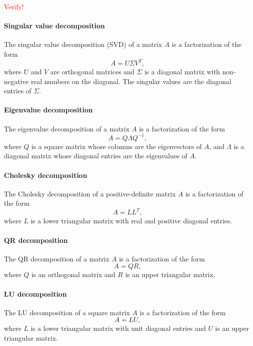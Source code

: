 \textcolor{red}{Verify!}

\paragraph{Singular value decomposition} The singular value decomposition (SVD) of a
matrix $A$ is a factorization of the form
\begin{equation}
  \label{eq:svd}
  A = U \Sigma V^T\text{,}
\end{equation}
where $U$ and $V$ are orthogonal matrices and $\Sigma$ is a diagonal
matrix with non-negative real numbers on the diagonal.  The singular values are the
diagonal entries of $\Sigma$.

\paragraph{Eigenvalue decomposition}  The eigenvalue decomposition of a matrix $A$
is a factorization of the form
\begin{equation}
  \label{eq:eigdec}
  A = Q \Lambda Q^{-1}\text{,}
\end{equation}
where $Q$ is a square matrix whose columns are the eigenvectors of $A$, and
$\Lambda$ is a diagonal matrix whose diagonal entries are the eigenvalues of
$A$.

\paragraph{Cholesky decomposition}  The Cholesky decomposition of a positive-definite
matrix $A$ is a factorization of the form
\begin{equation}
  \label{eq:chol}
  A = L L^T\text{,}
\end{equation}
where $L$ is a lower triangular matrix with real and positive diagonal entries.

\paragraph{QR decomposition}  The QR decomposition of a matrix $A$ is a
factorization of the form
\begin{equation}
  \label{eq:qr}
  A = Q R\text{,}
\end{equation}
where $Q$ is an orthogonal matrix and $R$ is an upper triangular matrix.

\paragraph{LU decomposition}  The LU decomposition of a square matrix $A$ is a
factorization of the form
\begin{equation}
  \label{eq:lu}
  A = L U\text{,}
\end{equation}
where $L$ is a lower triangular matrix with unit diagonal entries and $U$ is
an upper triangular matrix.


